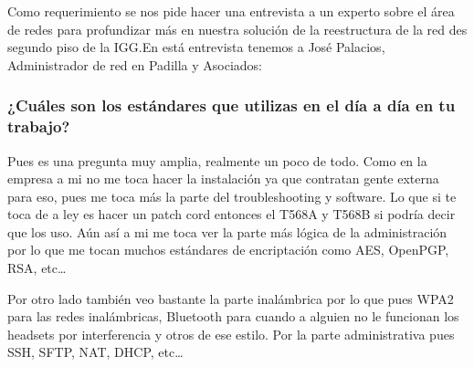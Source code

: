 \documentclass[../main.tex]{subfiles}
\begin{document}

Como requerimiento se nos pide hacer una entrevista a un experto sobre
el área de redes para profundizar más en nuestra solución de la reestructura
de la red des segundo piso de la IGG.\@ En está entrevista tenemos a
José Palacios, Administrador de red en Padilla y Asociados:


\subsubsection*{¿Cuáles son los estándares que utilizas en el día a día en tu trabajo?}

Pues es una pregunta muy amplia, realmente un poco de todo. Como en la empresa a mi no me toca hacer la instalación ya que contratan gente externa para eso, pues me toca más la parte del troubleshooting y software. Lo que si te toca de a ley es hacer un patch cord entonces el T568A y T568B si podría decir que los uso. Aún así a mi me toca ver la parte más lógica de la administración por lo que me tocan muchos estándares de encriptación como AES, OpenPGP, RSA, etc\ldots

\medskip

Por otro lado también veo bastante la parte inalámbrica por lo que pues WPA2 para las redes inalámbricas, Bluetooth para cuando a alguien no le funcionan los headsets por interferencia y otros de ese estilo. Por la parte administrativa pues SSH, SFTP, NAT, DHCP, etc\ldots
\end{document}
